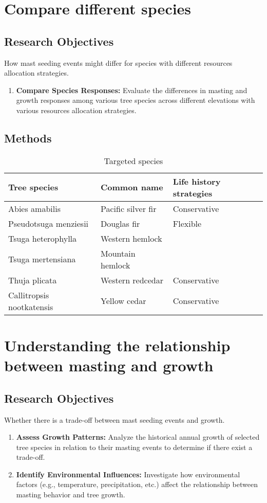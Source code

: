 \documentclass[11pt,letter]{article}
\begin{document}
\section{Compare different species}
\subsection{Research Objectives}
How mast seeding events might differ for species with different resources allocation strategies.
	\begin{enumerate}
	\item \textbf{Compare Species Responses:} Evaluate the differences in masting and growth responses among various tree species across different elevations with various resources allocation strategies.
	\end{enumerate}
\subsection{Methods}
\begin{table}[htb]
	\centering
	\small
	\caption{Targeted species}
\begin{tabular}{|p{5cm}|p{5cm}|p{5cm}|}
\hline
 Tree species & Common name & Life history strategies\\ \hline
Abies amabilis & Pacific silver fir & Conservative \\ \hline
Pseudotsuga menziesii & Douglas fir & Flexible    \\\hline
Tsuga heterophylla & Western hemlock &     \\\hline
Tsuga mertensiana & Mountain hemlock &     \\\hline
Thuja plicata & Western redcedar & Conservative    \\\hline
Callitropsis nootkatensis & Yellow cedar & Conservative    \\\hline

\end{tabular}

\end{table}
\section{Understanding the relationship between masting and growth}
\subsection{Research Objectives}
Whether there is a trade-off between mast seeding events and growth.
	\begin{enumerate}
	\item \textbf{Assess Growth Patterns:} Analyze the historical annual growth of selected tree species in relation to their masting events to determine if there exist a trade-off.
	\item \textbf{Identify Environmental Influences:} Investigate how environmental factors (e.g., temperature, precipitation, etc.) affect the relationship between masting behavior and tree growth.	
	\end{enumerate}
\end{document}
